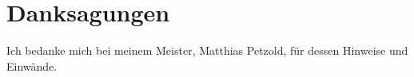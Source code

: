 \section{Danksagungen}
Ich bedanke mich bei meinem Meister, Matthias Petzold, für dessen Hinweise und Einwände.
